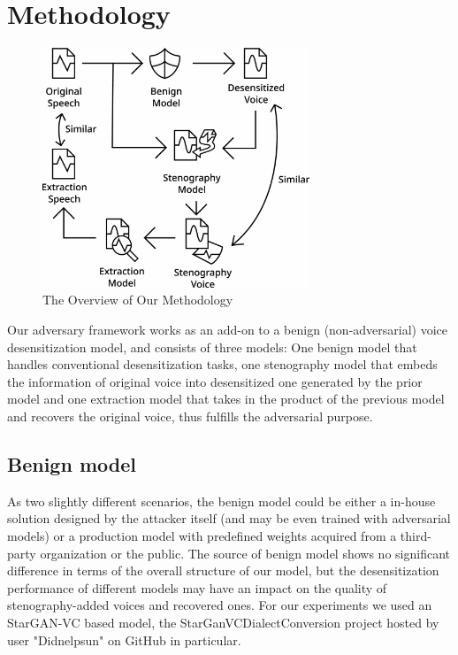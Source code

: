 \documentclass[journal]{IEEEtran} %
\begin{document}
\section{Methodology}

\begin{figure}[htbp]
    \centerline{\includegraphics[width=8cm]{method.png}}
    \caption{The Overview of Our Methodology}
    \label{overview}
\end{figure}

Our adversary framework works as an add-on to a benign (non-adversarial) voice desensitization model, and consists of three models: One benign model that handles conventional desensitization tasks, one stenography model that embeds the information of original voice into desensitized one generated by the prior model and one extraction model that takes in the product of the previous model and recovers the original voice, thus fulfills the adversarial purpose.

\subsection{Benign model}

As two slightly different scenarios, the benign model could be either a in-house solution designed by the attacker itself (and may be even trained with adversarial models) or a production model with predefined weights acquired from a third-party organization or the public. The source of benign model shows no significant difference in terms of the overall structure of our model, but the desensitization performance of different models may have an impact on the quality of stenography-added voices and recovered ones. For our experiments we used an StarGAN-VC\cite{a3} based model,  the StarGanVCDialectConversion project hosted by user "Didnelpsun" on GitHub\cite{a2} in particular.
\end{document}
